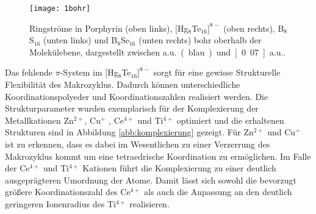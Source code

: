  

\begin{figure}[ht!]
	\centering
	\texttt{[image: 1bohr]}
	\captionsetup{figurewithin = chapter}
	\captionsetup{font=small, labelfont=bf}\caption[{Ringströme in Porphyrin, $[$Hg$_8$Te$_{16}]^{8-}$, B$_8$S$_{16}$ und B$_8$Se$_{16}$}]{Ringströme in Porphyrin (oben links), $[$Hg$_8$Te$_{16}]^{8-}$ (oben rechts), B$_8$S$_{16}$ (unten links) und B$_8$Se$_{16}$ (unten rechts) \unit[1]{bohr} oberhalb der Molekülebene, dargestellt zwischen \unit[0]{a.u.} (blau) und \unit[0.07]{a.u.}.}
\label{abb:lic}
\end{figure}

\FloatBarrier
Das fehlende $\pi$-System im $[$Hg$_8$Te$_{16}]^{8-}$ sorgt für eine gewisse Strukturelle Flexibilität des Makrozyklus. Dadurch können unterschiedliche Koordinationspolyeder und Koordinationszahlen realisiert werden. Die Strukturparameter wurden exemplarisch für der Komplexierung der Metallkationen Zn$^{2+}$, Cu$^+$ , Ce$^{4+}$ und Ti$^{4+}$ optimiert und die erhaltenen Strukturen sind in Abbildung \ref{abb:komplexierung} gezeigt. Für Zn$^{2+}$ und Cu$^+$ ist zu erkennen, dass es dabei im Wesentlichen zu einer Verzerrung des Makrozyklus kommt um eine tetraedrische Koordination zu ermöglichen. Im Falle der Ce$^{4+}$ und Ti$^{4+}$ Kationen führt die Komplexierung zu einer deutlich ausgeprägteren Umordnung der Atome. Damit lässt sich sowohl die bevorzugt größere Koordinationszahl des Ce$^{4+}$ als auch die Anpassung an den deutlich geringeren Ionenradius des Ti$^{4+}$ realisieren.


